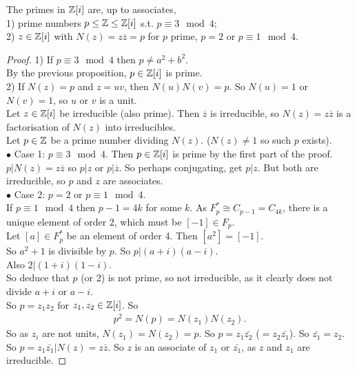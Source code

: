 \documentclass[a4paper]{article}
\begin{document}
\begin{prop}
The primes in $\mathbb{Z}[i]$ are, up to associates,\\
1) prime numbers $p\leq \mathbb{Z} \leq \mathbb{Z}[i]$ s.t. $p\equiv 3 \mod 4$;\\
2) $z\in\mathbb{Z}[i]$ with $N\left(z\right)=z\overline{z}=p$ for $p$ prime, $p=2$ or $p \equiv 1 \mod 4$.
\begin{proof}
1) If $p\equiv 3 \mod 4$ then $p\neq a^2+b^2$.\\
By the previous proposition, $p\in\mathbb{Z}[i]$ is prime.\\
2) If $N\left(z\right)=p$ and $z=uv$, then $N\left(u\right)N\left(v\right)=p$. So $N\left(u\right)=1$ or $N\left(v\right)=1$, so $u$ or $v$ is a unit.\\
Let $z\in\mathbb{Z}[i]$ be irreducible (also prime). Then $\overline{z}$ is irreducible, so $N\left(z\right) = z\overline{z}$ is a factorisation of $N\left(z\right)$ into irreducibles.\\
Let $p\in\mathbb{Z}$ be a prime number dividing $N\left(z\right)$. ($N\left(z\right)\neq 1$ so such $p$ exists).\\
$\bullet$ Case 1: $p\equiv 3 \mod 4$. Then $p\in\mathbb{Z}[i]$ is prime by the first part of the proof. $p|N\left(z\right)=z\overline{z}$ so $p|z$ or $p|\overline{z}$. So perhaps conjugating, get $p|z$. But both are irreducible, so $p$ and $z$ are associates.\\
$\bullet$ Case 2: $p=2$ or $p\equiv 1 \mod 4$.\\
If $p\equiv 1\mod 4$ then $p-1 = 4k$ for some $k$. As $F_p^* \cong C_{p-1} = C_{4k}$, there is a unique element of order $2$, which must be $[-1]\in F_p$.\\
Let $[a]\in F_p^*$ be an element of order 4. Then $[a^2] = [-1]$.\\
So $a^2 + 1$ is divisible by $p$. So $p|\left(a+i\right)\left(a-i\right)$.\\
Also $2|\left(1+i\right)\left(1-i\right)$.\\
So deduce that $p$ (or 2) is not prime, so not irreducible, as it clearly does not divide $a+i$ or $a-i$.\\
So $p=z_1 z_2$ for $z_1, z_2 \in \mathbb{Z}[i]$. So
\begin{equation*}
\begin{aligned}
p^2 = N\left(p\right) = N\left(z_1\right)N\left(z_2\right).
\end{aligned}
\end{equation*}
So as $z_i$ are not units, $N\left(z_1\right) = N\left(z_2\right) = p$. So $p=z_1 \bar{z_2}$ ($=z_2 \bar{z_1}$). So $\bar{z_1} = z_2$.\\
So $p=z_1 \bar{z_1} | N\left(z\right) = z\bar{z}$. So $z$ is an associate of $z_1$ or $\bar{z_1}$, as $z$ and $z_1$ are irreducible.
\end{proof}
\end{prop}
\end{document}
